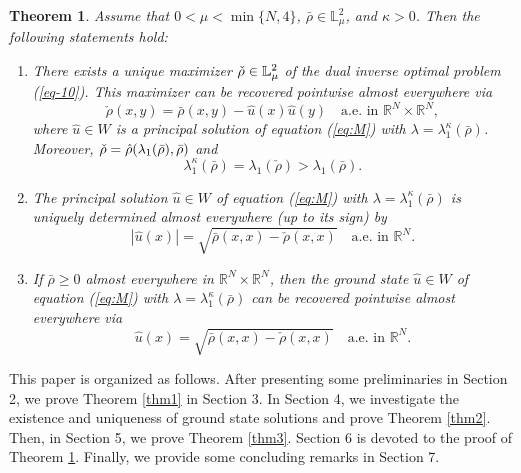\documentclass[12pt,thmsa]{article}
\newtheorem{theorem}{Theorem}[section]
\begin{document}
\begin{theorem}
\label{thm4} Assume that $0<\mu <\min \{N,4\}$, $\bar{\rho}\in \mathbb{L}%
_{\mu }^{2}$, and $\kappa >0$. Then the following statements hold:

\begin{enumerate}
\item[$(i)$] There exists a \emph{unique} maximizer $\check{\rho}\in \mathbb{%
L}_{\mu }^{2}$ of the dual inverse optimal problem (\ref{eq-10}). This
maximizer can be recovered pointwise almost everywhere via
\begin{equation*}
\check{\rho}(x,y)=\bar{\rho}(x,y)-\hat{u}(x)\hat{u}(y)\quad \text{a.e. in }%
\mathbb{R}^{N}\times \mathbb{R}^{N},  \label{eq:rho_recovery}
\end{equation*}%
where $\hat{u}\in W$ is a principal solution of equation (\ref{eq:M}) with $%
\lambda =\lambda _{1}^{\kappa }(\bar{\rho})$. Moreover, $\check{\rho}=\hat{%
\rho}(\lambda _{1}(\bar{\rho}),\bar{\rho})$ and
\begin{equation*}
\lambda _{1}^{\kappa }(\bar{\rho})=\lambda _{1}(\check{\rho})>\lambda _{1}(%
\bar{\rho}).
\end{equation*}

\item[$(ii)$] The principal solution $\hat{u}\in W$ of equation (\ref{eq:M})
with $\lambda =\lambda _{1}^{\kappa }(\bar{\rho})$ is uniquely determined
almost everywhere (up to its sign) by
\begin{equation*}
|\hat{u}(x)|=\sqrt{\bar{\rho}(x,x)-\check{\rho}(x,x)}\quad \text{a.e. in }%
\mathbb{R}^{N}.  \label{eq:principal_solution}
\end{equation*}

\item[$(iii)$] If $\bar{\rho}\geq 0$ almost everywhere in $\mathbb{R}%
^{N}\times \mathbb{R}^{N}$, then the ground state $\hat{u}\in W$ of equation
(\ref{eq:M}) with $\lambda =\lambda _{1}^{\kappa }(\bar{\rho})$ can be
recovered pointwise almost everywhere via
\begin{equation*}
\hat{u}(x)=\sqrt{\bar{\rho}(x,x)-\check{\rho}(x,x)}\quad \text{a.e. in }%
\mathbb{R}^{N}.  \label{eq:ground_state_recovery}
\end{equation*}
\end{enumerate}
\end{theorem}

This paper is organized as follows. After presenting some preliminaries in
Section 2, we prove Theorem \ref{thm1} in Section 3. In Section 4, we
investigate the existence and uniqueness of ground state solutions and prove
Theorem \ref{thm2}. Then, in Section 5, we prove Theorem \ref{thm3}. Section
6 is devoted to the proof of Theorem \ref{thm4}. Finally, we provide some
concluding remarks in Section 7.
\end{document}
